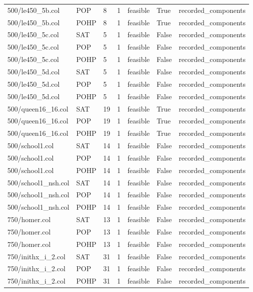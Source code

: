 \begin{table}[htbp]
\begin{tabular}{lllllll}
500/le450\_5b.col & POP & 8 & 1 & feasible & True & recorded\_components \\
500/le450\_5b.col & POHP & 8 & 1 & feasible & True & recorded\_components \\
500/le450\_5c.col & SAT & 5 & 1 & feasible & False & recorded\_components \\
500/le450\_5c.col & POP & 5 & 1 & feasible & False & recorded\_components \\
500/le450\_5c.col & POHP & 5 & 1 & feasible & False & recorded\_components \\
500/le450\_5d.col & SAT & 5 & 1 & feasible & False & recorded\_components \\
500/le450\_5d.col & POP & 5 & 1 & feasible & False & recorded\_components \\
500/le450\_5d.col & POHP & 5 & 1 & feasible & False & recorded\_components \\
500/queen16\_16.col & SAT & 19 & 1 & feasible & True & recorded\_components \\
500/queen16\_16.col & POP & 19 & 1 & feasible & True & recorded\_components \\
500/queen16\_16.col & POHP & 19 & 1 & feasible & True & recorded\_components \\
500/school1.col & SAT & 14 & 1 & feasible & False & recorded\_components \\
500/school1.col & POP & 14 & 1 & feasible & False & recorded\_components \\
500/school1.col & POHP & 14 & 1 & feasible & False & recorded\_components \\
500/school1\_nsh.col & SAT & 14 & 1 & feasible & False & recorded\_components \\
500/school1\_nsh.col & POP & 14 & 1 & feasible & False & recorded\_components \\
500/school1\_nsh.col & POHP & 14 & 1 & feasible & False & recorded\_components \\
750/homer.col & SAT & 13 & 1 & feasible & False & recorded\_components \\
750/homer.col & POP & 13 & 1 & feasible & False & recorded\_components \\
750/homer.col & POHP & 13 & 1 & feasible & False & recorded\_components \\
750/inithx\_i\_2.col & SAT & 31 & 1 & feasible & False & recorded\_components \\
750/inithx\_i\_2.col & POP & 31 & 1 & feasible & False & recorded\_components \\
750/inithx\_i\_2.col & POHP & 31 & 1 & feasible & False & recorded\_components \\

\end{tabular}
\end{table}
